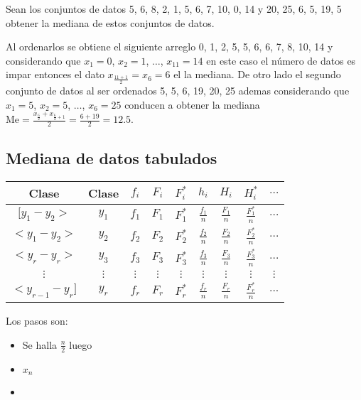\documentclass[10pt,]{krantz}
\theoremstyle{definition}
\theoremstyle{definition}
\theoremstyle{definition}
\theoremstyle{remark}
\let\BeginKnitrBlock\begin \let\EndKnitrBlock\end
\begin{document}
\BeginKnitrBlock{exercise}
\protect\hypertarget{exr:unnamed-chunk-5}{}{\label{exr:unnamed-chunk-5} }Sean los conjuntos de datos 5, 6, 8, 2, 1, 5, 6, 7, 10, 0, 14 y 20, 25, 6, 5, 19, 5 obtener la mediana de estos conjuntos de datos.
\EndKnitrBlock{exercise}

\BeginKnitrBlock{solution}
\iffalse{} {Solución. } \fi{}Al ordenarlos se obtiene el siguiente arreglo 0, 1, 2, 5, 5, 6, 6, 7, 8, 10, 14 y considerando que \(x_1=0\), \(x_2=1\), \(\ldots\), \(x_{11}=14\) en este caso el número de datos es impar entonces el dato \(x_{\frac{11+1}{2}}=x_{6}=6\) el la mediana. De otro lado el segundo conjunto de datos al ser ordenados 5, 5, 6, 19, 20, 25 ademas considerando que \(x_1=5\), \(x_2=5\), \(\ldots\), \(x_6=25\) conducen a obtener la mediana \(\text{Me}=\frac{x_{\frac{6}{2}}+x_{\frac{6}{2}+1}}{2}=\frac{6+19}{2}=12.5\).
\EndKnitrBlock{solution}

\hypertarget{mediana-de-datos-tabulados}{%
\subsection{Mediana de datos tabulados}\label{mediana-de-datos-tabulados}}

\begin{longtable}[]{@{}ccccccccc@{}}
\toprule
Clase & Clase & \(f_i\) & \(F_i\) & \(F_i^*\) & \(h_i\) & \(H_i\) & \(H_i^*\) & \(\ldots\)\tabularnewline
\midrule
\endhead
\([y_1-y_2>\) & \(y_1\) & \(f_1\) & \(F_1\) & \(F_1^*\) & \(\frac{f_1}{n}\) & \(\frac{F_1}{n}\) & \(\frac{F_1^*}{n}\) & \(\ldots\)\tabularnewline
\(<y_1-y_2>\) & \(y_2\) & \(f_2\) & \(F_2\) & \(F_2^*\) & \(\frac{f_2}{n}\) & \(\frac{F_2}{n}\) & \(\frac{F_2^*}{n}\) & \(\ldots\)\tabularnewline
\(<y_{r}-y_r>\) & \(y_3\) & \(f_3\) & \(F_3\) & \(F_3^*\) & \(\frac{f_3}{n}\) & \(\frac{F_3}{n}\) & \(\frac{F_3^*}{n}\) & \(\ldots\)\tabularnewline
\(\vdots\) & \(\vdots\) & \(\vdots\) & \(\vdots\) & \(\vdots\) & \(\vdots\) & \(\vdots\) & \(\vdots\) & \(\vdots\)\tabularnewline
\(<y_{r-1}-y_r]\) & \(y_r\) & \(f_r\) & \(F_r\) & \(F_r^*\) & \(\frac{f_r}{n}\) & \(\frac{F_r}{n}\) & \(\frac{F_r^*}{n}\) & \(...\)\tabularnewline
\bottomrule
\end{longtable}

Los pasos son:

\begin{itemize}
\item
  Se halla \(\frac{n}{2}\) luego
\item
  \(x_n\)
\item
\end{itemize}
\end{document}
